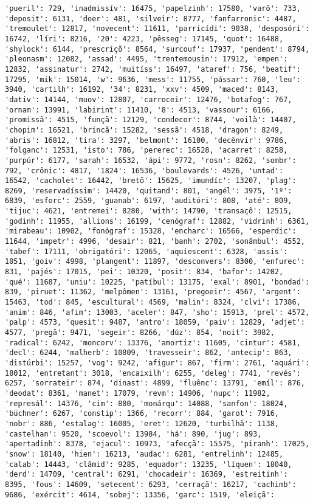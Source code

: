 \begin{Verbatim}[commandchars=\\\{\}]
'pueril': 729, 'inadmissív': 16475, 'papelzinh': 17580, 'varõ': 733, 'deposit': 6131, 'doer': 481, 'silveir': 8777, 'fanfarronic': 4487, 'tremoulet': 12817, 'novecent': 11611, 'parricídi': 9038, 'desposóri': 16742, 'líri': 8216, '20': 4223, 'pêsseg': 17145, 'quot': 16488, 'shylock': 6144, 'prescriçõ': 8564, 'surcouf': 17937, 'pendent': 8794, 'pleonasm': 12082, 'assad': 4495, 'trentemousin': 17912, 'empen': 12832, 'assinatur': 2742, 'muitíss': 16497, 'ataref': 756, 'beatif': 17295, 'mik': 15014, 'w': 9636, 'mess': 11755, 'pássar': 760, 'leu': 3940, 'cartilh': 16192, '34': 8231, 'xxv': 4509, 'maced': 8143, 'dativ': 14144, 'muov': 12807, 'carroceir': 12476, 'botafog': 767, 'ornam': 13991, 'labirint': 11410, '8': 4513, 'vassour': 6166, 'promissã': 4515, 'funçã': 12129, 'condecor': 8744, 'voilà': 14407, 'chopim': 16521, 'brincã': 15282, 'sessã': 4518, 'dragon': 8249, 'abris': 16812, 'tira': 3297, 'belmont': 16100, 'decênvir': 9786, 'folganc': 12531, 'isto': 786, 'pererec': 16528, 'acarret': 8258, 'purpúr': 6177, 'sarah': 16532, 'ápi': 9772, 'rosn': 8262, 'sombr': 792, 'crônic': 4817, '1824': 16536, 'boulevards': 4526, 'untad': 16542, 'cacholet': 16442, 'bretõ': 15625, 'imundíc': 13207, 'plag': 8269, 'reservadíssim': 14420, 'quitand': 801, 'angél': 3975, '1º': 6839, 'esforc': 2559, 'guanab': 6197, 'auditóri': 808, 'até': 809, 'tijuc': 4621, 'entremei': 8280, 'with': 14790, 'transaçõ': 12515, 'godinh': 11955, 'allions': 16199, 'cenógraf': 12882, 'vidrinh': 6361, 'mirabeau': 10902, 'fonógraf': 15328, 'encharc': 16566, 'esperdic': 11644, 'impetr': 4996, 'desair': 821, 'banh': 2702, 'sonâmbul': 4552, 'tabef': 17111, 'obrigatóri': 12065, 'aquiescent': 6328, 'assis': 1051, 'goiv': 4998, 'plangent': 11897, 'desconvers': 8300, 'enfurec': 831, 'pajés': 17015, 'pei': 10320, 'posit': 834, 'bafor': 14202, 'qué': 11687, 'uniu': 10225, 'patíbul': 13175, 'exal': 8901, 'bondad': 839, 'piruet': 11362, 'melpômen': 13161, 'pregoeir': 4567, 'argent': 15463, 'tod': 845, 'escultural': 4569, 'malin': 8324, 'clvi': 17386, 'anim': 846, 'afim': 13003, 'aceler': 847, 'sho': 15913, 'prel': 4572, 'palp': 4573, 'quesit': 9487, 'antro': 18059, 'paiv': 12829, 'adjet': 4577, 'pregã': 9471, 'segeir': 8266, 'dúz': 854, 'noit': 3982, 'radical': 6242, 'moncorv': 13376, 'amortiz': 11605, 'cintur': 4581, 'decl': 6244, 'malherb': 10809, 'travesseir': 862, 'antecip': 863, 'distúrbi': 15257, 'vog': 9242, 'afigur': 867, 'firm': 2761, 'aquári': 18012, 'entretant': 3018, 'encaixilh': 6255, 'deleg': 7741, 'revés': 6257, 'sorrateir': 874, 'dinast': 4899, 'fluênc': 13791, 'emíl': 876, 'deodat': 8361, 'manet': 17079, 'revm': 14906, 'nupc': 11982, 'represál': 14376, 'cim': 880, 'monárqu': 14088, 'sanfon': 18024, 'büchner': 6267, 'constip': 1366, 'recorr': 884, 'garot': 7916, 'nobr': 886, 'estalag': 16005, 'eret': 12620, 'turbilhã': 1138, 'castelhan': 9520, 'scoevol': 13984, 'há': 890, 'jug': 893, 'apertadinh': 8378, 'ejacul': 10973, 'afecçã': 15575, 'piranh': 17025, 'snow': 18140, 'hien': 16213, 'audac': 6281, 'entrelinh': 12485, 'calab': 14443, 'clâmid': 9285, 'equador': 13235, 'líquen': 18040, 'derd': 14709, 'central': 6291, 'chocadeir': 16369, 'estreitinh': 8395, 'fous': 14609, 'setecent': 6293, 'cerraçã': 16217, 'cachimb': 9686, 'exércit': 4614, 'sobej': 13356, 'garc': 1519, 'eleiçã': 
\end{Verbatim}
